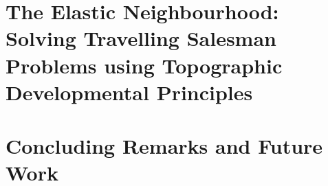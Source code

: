 \documentclass[fleqn,a4paper,10pt,twoside,titlepage]{report}
\theoremstyle{definition}
\begin{document}
\chapter{The Elastic Neighbourhood: Solving Travelling Salesman Problems using Topographic Developmental Principles \label{chapter:elastic}}

\chapter{Concluding Remarks and Future Work}


\renewcommand{\bibname}{References}

\renewcommand{\bibname}{References}
\appendix
\chapter{}

%
\chapter{}

\end{document}
